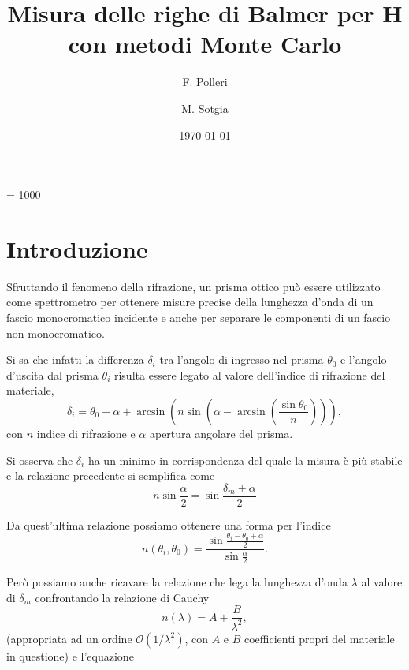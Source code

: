 \documentclass[a4paper,aps,12pt,tightenlines]{revtex4-2}
\begin{document}
\count\footins = 1000
\title{Misura delle righe di Balmer per H con metodi Monte Carlo}
\author{F. Polleri}
\author{M. Sotgia}
\date{\today}
\maketitle

\section{Introduzione}
Sfruttando il fenomeno della rifrazione, un prisma ottico può essere utilizzato come spettrometro per ottenere misure precise della lunghezza d'onda di un fascio monocromatico incidente e anche per separare le componenti di un fascio non monocromatico. 

Si sa che infatti la differenza $\delta_i$ tra l'angolo di ingresso nel prisma $\theta_0$ e l'angolo d'uscita dal prisma $\theta_i$ risulta essere legato al valore dell'indice di rifrazione del materiale, \begin{equation}\delta_i = \theta_0 - \alpha+\arcsin\left(n\sin\left(\alpha - \arcsin\left(\frac{\sin\theta_0}{n}\right)\right)\right),\end{equation} con $n$ indice di rifrazione e $\alpha$ apertura angolare del prisma. 

Si osserva che $\delta_i$ ha un minimo in corrispondenza del quale la misura è più stabile e la relazione precedente si semplifica come \begin{equation} n\sin\frac{\alpha}{2} = \sin\frac{\delta_m + \alpha}{2} \end{equation}

Da quest'ultima relazione possiamo ottenere una forma per l'indice \begin{equation} n(\theta_i, \theta_0) = \frac{\sin\frac{\theta_i-\theta_0 + \alpha}{2}}{\sin\frac{\alpha}{2}}.\label{eq:nthth0}\end{equation}

Però possiamo anche ricavare la relazione che lega la lunghezza d'onda $\lambda$ al valore di $\delta_m$ confrontando la relazione di Cauchy \begin{equation} n(\lambda) = A + \frac{B}{\lambda^2},\end{equation} (appropriata ad un ordine $\mathcal O (1/\lambda^2)$, con $A$ e $B$ coefficienti propri del materiale in questione) e l'equazione 
\end{document}

